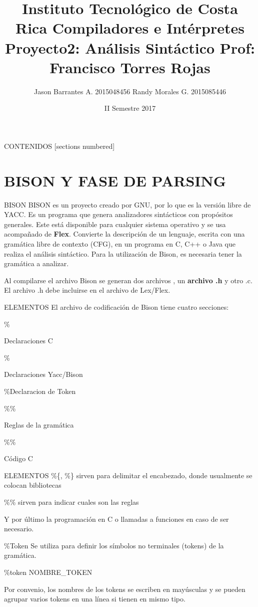 \documentclass[10pt]{beamer}
\title{\small Instituto Tecnológico de Costa Rica \newline 
        Compiladores e Intérpretes \newline 
        Proyecto2: Análisis Sintáctico \newline 
        Prof: Francisco Torres Rojas}
\date{II Semestre 2017}
\author{\large Jason Barrantes A. 2015048456 \newline 
                 Randy Morales G. 2015085446 \newline}
\begin{document}
 
\maketitle 
\begin{frame}[fragile]{CONTENIDOS} 
    [sections numbered] 
    \tableofcontents 
\end{frame} 

\section{BISON Y FASE DE PARSING}
\begin{frame}[fragile]{BISON} 
    BISON es un proyecto creado por GNU, por lo que es la versión libre de YACC. 
    Es un programa que genera analizadores sintácticos con propósitos generales. 
    Este está disponible para cualquier sistema operativo y se usa acompañado de \textbf{Flex}. 
    Convierte la descripción de un lenguaje, escrita con una gramática libre de contexto (CFG), 
    en un programa en C, C++ o Java que realiza el análisis sintáctico. Para la utilización de Bison, 
    es necesaria tener la gramática a analizar. \newline 
    
    Al compilarse el archivo Bison se generan dos archivos , un \textbf{archivo .h} y otro .c. 
    El archivo .h debe incluirse en el archivo de Lex/Flex. 
\end{frame} 

\begin{frame}[fragile]{ELEMENTOS} 
    El archivo de codificación de Bison tiene cuatro secciones: 
    
    \%{ 
    
    Declaraciones C 
    
    \%} 
    
    Declaraciones Yacc/Bison 
    
    \%Declaracion de Token 
    
    \%\% 
    
    Reglas de la gramática 
    
    \%\% 
    
    Código C 
\end{frame} 
\begin{frame}[fragile]{ELEMENTOS} 
    \%\{, \%\} sirven para delimitar el encabezado, donde usualmente se colocan bibliotecas 
    
    \%\% sirven para indicar cuales son las reglas 
    
    Y por último la programación en C o llamadas a funciones en caso de ser necesario. 
    
    \%Token Se utiliza para definir los símbolos no terminales (tokens) de la gramática. 
    
    \%token NOMBRE_TOKEN 
    
    Por convenio, los nombres de los tokens se escriben en mayúsculas y se pueden agrupar varios  
    tokens en una línea si tienen en mismo tipo. 
\end{frame} 
\end{document}

